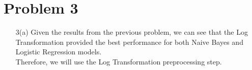 \documentclass[10pt,letterpaper]{article}
\begin{document}
    \section{Problem 3}
        \begin{itemize}
            \item[3(a)]
                Given the results from the previous problem, we can see that the Log Transformation provided the best performance for both Naive Bayes and Logistic Regression models.\\
                Therefore, we will use the Log Transformation preprocessing step.
            \item[] 
        \end{itemize}         
\end{document}

